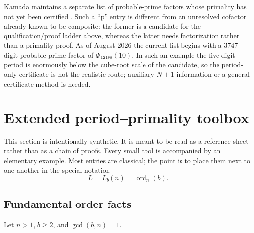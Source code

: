 \documentclass[11pt]{article}
\newcommand{\ord}{\operatorname{ord}}
\begin{document}
Kamada maintains a separate list of probable-prime factors whose primality
has not yet been certified \cite{KamadaPRP}.  Such a ``p'' entry is different
from an unresolved cofactor already known to be composite: the former is a
candidate for the qualification/proof ladder above, whereas the latter needs
factorization rather than a primality proof.  As of August 2026 the current
list begins with a $3747$-digit probable-prime factor of
$\Phi_{12198}(10)$.  In such an example the five-digit period is enormously
below the cube-root scale of the candidate, so the period-only certificate is
not the realistic route; auxiliary $N\pm1$ information or a general
certificate method is needed.


\section{Extended period--primality toolbox}
\label{sec:toolbox}

This section is intentionally synthetic.  It is meant to be read as a
reference sheet rather than as a chain of proofs.  Every small tool is
accompanied by an elementary example.  Most entries are classical; the point
is to place them next to one another in the special notation
\[
L=L_b(n)=\ord_n(b).
\]

\begin{center}
\end{center}

\subsection{Fundamental order facts}

Let $n>1$, $b\ge2$, and $\gcd(b,n)=1$.
\end{document}
